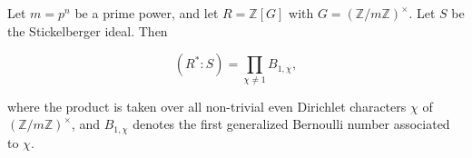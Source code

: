 Let $m = p^n$ be a prime power, and let $R = \mathbb{Z}[G]$ with $G = (\mathbb{Z}/m\mathbb{Z})^\times$.
Let $S$ be the Stickelberger ideal. Then

$$(R^* : S) = \prod_{\chi \neq 1} B_{1,\chi},$$

where the product is taken over all non-trivial even Dirichlet characters $\chi$ of
$(\mathbb{Z}/m\mathbb{Z})^\times$, and $B_{1,\chi}$ denotes the first generalized Bernoulli number
associated to $\chi$.

